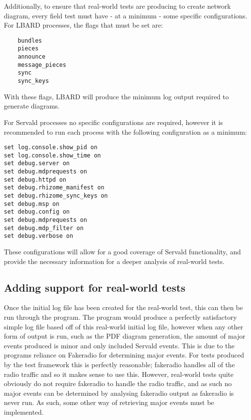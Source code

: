 Additionally, to ensure that real-world tests are producing to create network diagram, every field test must have - at a minimum - some specific configurations.
For LBARD processes, the flags that must be set are:
\begin{lstlisting}
    bundles
    pieces
    announce
    message_pieces
    sync
    sync_keys
    \end{lstlisting}

With these flags, LBARD will produce the minimum log output required to generate diagrams. 

For Servald processes no specific configurations are required, however it is recommended to run each process with the following configuration as a minimum:
\begin{lstlisting}
set log.console.show_pid on 
set log.console.show_time on 
set debug.server on 
set debug.mdprequests on 
set debug.httpd on 
set debug.rhizome_manifest on
set debug.rhizome_sync_keys on
set debug.msp on
set debug.config on
set debug.mdprequests on
set debug.mdp_filter on
set debug.verbose on
\end{lstlisting}
These configurations will allow for a good coverage of Servald functionality, and provide the necessary information for a deeper analysis of real-world tests.


\subsection{Adding support for real-world tests}

Once the initial log file has been created for the real-world test, this can then be run through the program. 
The program would produce a perfectly satisfactory simple log file based off of this real-world initial log file, however when any other form of output is run, such as the PDF diagram generation, the amount of major events produced is minor and only included Servald events.
This is due to the programs reliance on Fakeradio for determining major events.
For tests produced by the test framework this is perfectly reasonable; fakeradio handles all of the radio traffic and so it makes sense to use this.
However, real-world tests quite obviously do not require fakeradio to handle the radio traffic, and as such no major events can be determined by analysing fakeradio output as fakeradio is never run.
As such, some other way of retrieving major events must be implemented.

